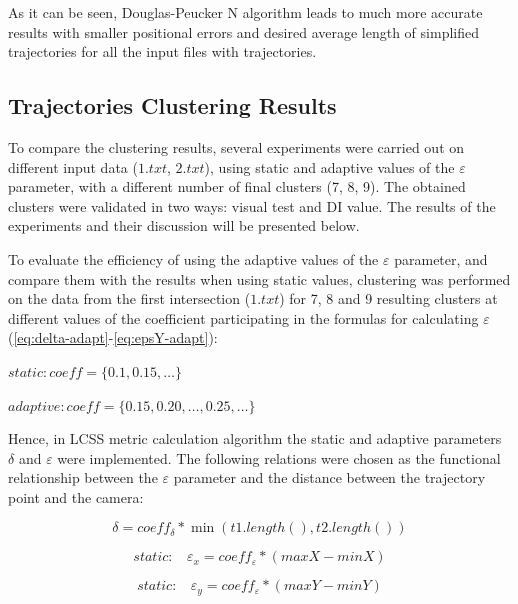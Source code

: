 As it can be seen, Douglas-Peucker N algorithm leads to much more accurate results with smaller positional errors and desired average length of simplified trajectories for all the input files with trajectories.

\subsection{Trajectories Clustering Results}

To compare the clustering results, several experiments were carried out on different input data ($1.txt$, $2.txt$), using static and adaptive values of the $\varepsilon$ parameter, with a different number of final clusters (7, 8, 9). The obtained clusters were validated in two ways: visual test and DI value. The results of the experiments and their discussion will be presented below.

To evaluate the efficiency of using the adaptive values of the $\varepsilon$ parameter, and compare them with the results when using static values, clustering was performed on the data from the first intersection ($1.txt$) for 7, 8 and 9 resulting clusters at different values of the coefficient participating in the formulas for calculating $\varepsilon$ (\ref{eq:delta-adapt}-\ref{eq:epsY-adapt}):

$static: coeff = \{\bm{0.1}, \bm{0.15}, \ldots\}$

$adaptive: coeff = \{0.15, \bm{0.20}, \ldots, 0.25, \ldots\}$

Hence, in LCSS metric calculation algorithm the static and adaptive parameters $\delta$ and $\varepsilon$ were implemented. The following relations were chosen as the functional relationship between the $\varepsilon$ parameter and the distance between the trajectory point and the camera:

\begin{equation} \label{eq:delta-adapt}
	\delta = coeff_\delta * \min{(t1.length(), t2.length())}
\end{equation}

\begin{equation} \label{eq:epsX-st}
	static:\ \ \ \ \varepsilon_x = coeff_\varepsilon * (maxX - minX)
\end{equation}

\begin{equation} \label{eq:epsY-st}
	static:\ \ \ \ \varepsilon_y = coeff_\varepsilon * (maxY - minY)
\end{equation}

